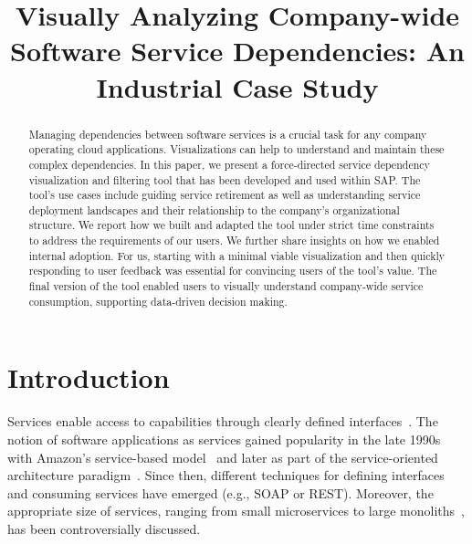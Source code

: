 \documentclass[conference]{IEEEtran}
\begin{document}
\title{Visually Analyzing Company-wide Software Service Dependencies: An Industrial Case Study}

\author{
\and
{}
\and
{}
}

\maketitle

\begin{abstract}
Managing dependencies between software services is a crucial task for any company operating cloud applications.
Visualizations can help to understand and maintain these complex dependencies.
In this paper, we present a force-directed service dependency visualization and filtering tool that has been developed and used within SAP.
The tool's use cases include guiding service retirement as well as understanding service deployment landscapes and their relationship to the company's organizational structure.
We report how we built and adapted the tool under strict time constraints to address the requirements of our users.
We further share insights on how we enabled internal adoption.
For us, starting with a minimal viable visualization and then quickly responding to user feedback was essential for convincing users of the tool's value.
The final version of the tool enabled users to visually understand company-wide service consumption, supporting data-driven decision making.
\end{abstract}


\section{Introduction}

Services enable access to capabilities through clearly defined interfaces~\cite{oasis-soa-rm2006}.
The notion of software applications as services gained popularity in the late 1990s with Amazon's service-based model~\cite{Vogels2022} and later as part of the service-oriented architecture paradigm~\cite{oasis-soa-rm2006}.
Since then, different techniques for defining interfaces and consuming services have emerged (e.g., SOAP or REST).
Moreover, the appropriate size of services, ranging from small microservices to large monoliths~\cite{DBLP:conf/icsm/FritzschB0Z19}, has been controversially discussed.
\end{document}
